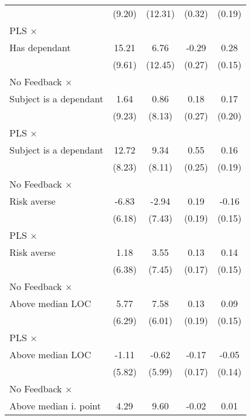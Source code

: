 \begin{table}[htbp]
\begin{tabular}{l*{4}{c}}
                &   (9.20)         &  (12.31)         &   (0.32)         &   (0.19)         \\
\addlinespace
PLS $\times$ \\ Has dependant&    15.21         &     6.76         &    -0.29         &     0.28\sym{*}  \\
                &   (9.61)         &  (12.45)         &   (0.27)         &   (0.15)         \\
\addlinespace
No Feedback $\times$ \\ Subject is a dependant&     1.64         &     0.86         &     0.18         &     0.17         \\
                &   (9.23)         &   (8.13)         &   (0.27)         &   (0.20)         \\
\addlinespace
PLS $\times$ \\ Subject is a dependant&    12.72         &     9.34         &     0.55\sym{**} &     0.16         \\
                &   (8.23)         &   (8.11)         &   (0.25)         &   (0.19)         \\
\addlinespace
No Feedback $\times$ \\ Risk averse&    -6.83         &    -2.94         &     0.19         &    -0.16         \\
                &   (6.18)         &   (7.43)         &   (0.19)         &   (0.15)         \\
\addlinespace
PLS $\times$ \\ Risk averse&     1.18         &     3.55         &     0.13         &     0.14         \\
                &   (6.38)         &   (7.45)         &   (0.17)         &   (0.15)         \\
\addlinespace
No Feedback $\times$ \\ Above median LOC&     5.77         &     7.58         &     0.13         &     0.09         \\
                &   (6.29)         &   (6.01)         &   (0.19)         &   (0.15)         \\
\addlinespace
PLS $\times$ \\ Above median LOC&    -1.11         &    -0.62         &    -0.17         &    -0.05         \\
                &   (5.82)         &   (5.99)         &   (0.17)         &   (0.14)         \\
\addlinespace
No Feedback $\times$ \\ Above median i. point&     4.29         &     9.60         &    -0.02         &     0.01         \\

\end{tabular}
\end{table}
